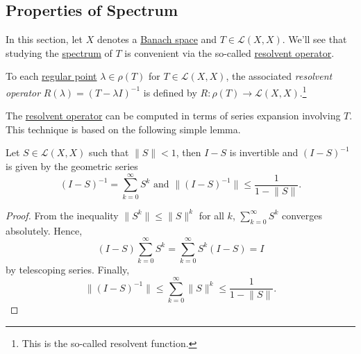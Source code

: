 \subsection{Properties of Spectrum}
In this section, let \(X\) denotes a \hyperref[def:Banach-space]{Banach space} and \(T\in \mathcal{L} (X, X)\). We'll see that studying the \hyperref[def:spectrum-point]{spectrum} of \(T\) is convenient via the so-called \hyperref[def:resolvent-op]{resolvent operator}.

\begin{definition}\label{def:resolvent-op}
	To each \hyperref[def:regular-point]{regular point} \(\lambda \in \rho (T)\) for \(T\in \mathcal{L} (X, X)\), the associated \emph{resolvent operator} \(R(\lambda) = (T-\lambda I)^{-1}\) is defined by \(R\colon \rho (T) \to \mathcal{L} (X, X)\).\footnote{This is the so-called resolvent function.}
\end{definition}

The \hyperref[def:resolvent-op]{resolvent operator} can be computed in terms of series expansion involving \(T\). This technique is based on the following simple lemma.

\begin{lemma}\label{lma:Von-Neumann}
	Let \(S\in \mathcal{L} (X, X)\) such that \(\lVert S \rVert < 1\), then \(I-S\) is invertible and \((I-S)^{-1} \) is given by the geometric series
	\[
		(I-S)^{-1} = \sum_{k=0} ^{\infty} S^k \text{ and }\lVert (I-S)^{-1} \rVert \leq \frac{1}{1 - \lVert S \rVert} .
	\]
\end{lemma}
\begin{proof}
	From the inequality \(\lVert S^k \rVert \leq \lVert S \rVert ^k\) for all \(k\), \(\sum_{k=0}^{\infty} S^k\) converges absolutely. Hence,
	\[
		(I-S) \sum_{k=0}^{\infty} S^k = \sum_{k=0}^{\infty} S^k(I-S) = I
	\]
	by telescoping series. Finally,
	\[
		\lVert (I-S)^{-1} \rVert \leq \sum_{k=0}^{\infty} \lVert S \rVert ^k \leq \frac{1}{1 - \lVert S \rVert }.
	\]
\end{proof}

